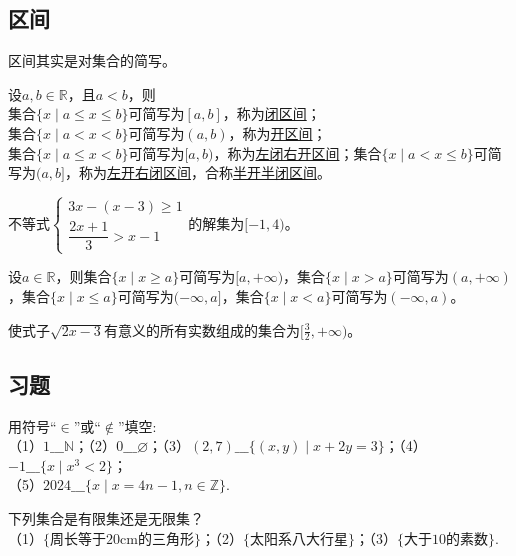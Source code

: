 \documentclass[lang=cn,math=cm,chinesefont=nofont,11pt,scheme=chinese,onecol]{elegantbook}
\begin{document}
\subsection{区间}
区间其实是对集合的简写。
\begin{definition}[区间]
	设$a,b\in\mathbb{R}$，且$a<b$，则\\集合$\{x\mid a\leq x\leq b\}$可简写为$[a,b]$，称为\underline{闭区间}；\\集合$\{x\mid a<x<b\}$可简写为$(a,b)$，称为\underline{开区间}；\\集合$\{x\mid a\leq x<b\}$可简写为$[a,b)$，称为\underline{左闭右开区间}；集合$\{x\mid a< x\leq b\}$可简写为$(a,b]$，称为\underline{左开右闭区间}，合称\underline{半开半闭区间}。
\end{definition}

\begin{example}
  不等式$\begin{cases}3x-(x-3)\geqslant1\\\dfrac{2x+1}{3}>x-1\end{cases}$的解集为$[-1,4)$。
\end{example}

\begin{definition}[无穷区间]
    设$a\in\mathbb{R}$，则集合$\{x\mid x\geq a\}$可简写为$[a,+\infty)$，集合$\{x\mid x>a\}$可简写为$(a,+\infty)$，集合$\{x\mid x\leq a\}$可简写为$(-\infty,a]$，集合$\{x\mid x<a\}$可简写为$(-\infty,a)$。
\end{definition}

\begin{example}
  使式子$\sqrt{2x-3}$有意义的所有实数组成的集合为$[\frac{3}{2},+\infty)$。
\end{example}

\subsection{习题}

\begin{exercise}\label{exer:1}
  用符号“$\in$”或“$\notin$”填空:\\
（1）$1\_\_\_\mathbb{N}$；（2）$0\_\_\_\varnothing$；（3）$(2,7)\_\_\_\{(x,y)\mid x+2y=3\}$；（4）$-1\_\_\_\{x\mid x^{3}<2\}$；\\（5）$2024\_\_\_\{x\mid x=4n-1,n\in\mathbb{Z}\}$.
\end{exercise}

\begin{exercise}\label{exer:2}
  下列集合是有限集还是无限集？\\
  （1）$\{\text{周长等于20cm的三角形}\}$；（2）$\{\text{太阳系八大行星}\}$；（3）$\{\text{大于10的素数}\}$.
\end{exercise}
\end{document}
